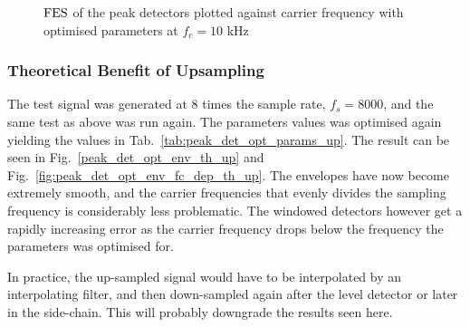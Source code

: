 \documentclass[../main2.tex]{subfiles}
\providecommand{\rootdir}{..}
\begin{document}
\begin{figure}[h]
\captionsetup{justification=centering}
\begin{subfigure}{\linewidth}
\centerline{}
\end{subfigure}
\par\bigskip
\begin{subfigure}{\linewidth}
\centerline{}
\end{subfigure}
\caption{$\text{FES}$ of the peak detectors plotted against carrier frequency with optimised parameters at $f_c=10$ kHz}
\label{fig:peak_det_opt_env_fc10000_dep_fes}
\end{figure}

\FloatBarrier
\subsubsection{Theoretical Benefit of Upsampling}
The test signal was generated at 8 times the sample rate, $f_s = 8000$, and the same test as above was run again. The parameters values was optimised again yielding the values in Tab.~\ref{tab:peak_det_opt_params_up}. The result can be seen in Fig.~\ref{peak_det_opt_env_th_up} and Fig.~\ref{fig:peak_det_opt_env_fc_dep_th_up}.
The envelopes have now become extremely smooth, and the carrier frequencies that evenly divides the sampling frequency is considerably less problematic. The windowed detectors however get a rapidly increasing error as the carrier frequency drops below the frequency the parameters was optimised for.

In practice, the up-sampled signal would have to be interpolated by an interpolating filter, and then down-sampled again after the level detector or later in the side-chain. This will probably downgrade the results seen here.
\end{document}
